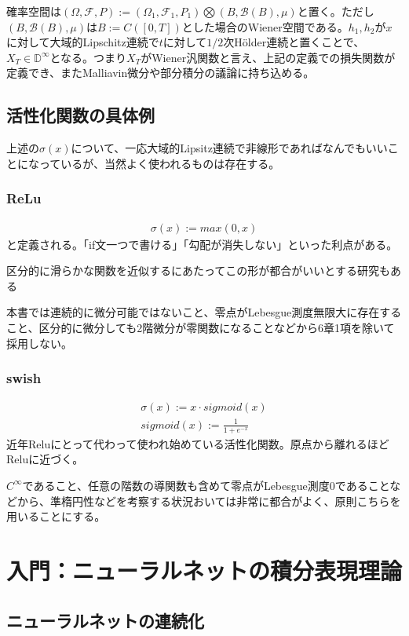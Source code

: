 \documentclass{jsarticle}
\begin{document}
確率空間は$(\Omega,\mathcal{F},P):=(\Omega_1,\mathcal{F}_1,P_1)\bigotimes(B,\mathcal{B}(B),\mu)$と置く。ただし$(B,\mathcal{B}(B),\mu)$は$B:=C([0,T])$とした場合のWiener空間である。$h_1,h_2$が$x$に対して大域的Lipschitz連続で$t$に対して$1/2$次Hölder連続と置くことで、$X_T\in\mathbb{D}^\infty$となる。つまり$X_T$がWiener汎関数と言え、上記の定義での損失関数が定義でき、またMalliavin微分や部分積分の議論に持ち込める。



\subsection{活性化関数の具体例}
上述の$\sigma(x)$について、一応大域的Lipsitz連続で非線形であればなんでもいいことになっているが、当然よく使われるものは存在する。

\subsubsection{ReLu}
\begin{align}
\sigma(x):=max(0,x)
\end{align}
と定義される。「if文一つで書ける」「勾配が消失しない」といった利点がある。

区分的に滑らかな関数を近似するにあたってこの形が都合がいいとする研究もある

本書では連続的に微分可能ではないこと、零点がLebesgue測度無限大に存在すること、区分的に微分しても2階微分が零関数になることなどから6章1項を除いて採用しない。

\subsubsection{swish}
\begin{align}
\sigma(x):=x\cdot sigmoid(x)\\
sigmoid(x):=\frac{1}{1+e^{-x}}
\end{align}
近年Reluにとって代わって使われ始めている活性化関数。原点から離れるほどReluに近づく。

$C^\infty$であること、任意の階数の導関数も含めて零点がLebesgue測度0であることなどから、準楕円性などを考察する状況おいては非常に都合がよく、原則こちらを用いることにする。

\newpage
\section{入門：ニューラルネットの積分表現理論}

\subsection{ニューラルネットの連続化}
\end{document}
